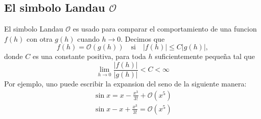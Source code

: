 \documentclass{article}
\begin{document}
\subsection{El simbolo Landau $\mathcal O$}
El simbolo Landau $\mathcal O$ es usado para comparar el
comportamiento de una funcion $f(h)$ con otra $g(h)$ cuando $h\to
0$. Decimos que 
\begin{equation}
f(h)=\mathcal{O}(g(h))\quad \text{si}\quad |f(h)|\leq C|g(h)|,
\end{equation}
donde $C$ es una constante positiva, para toda $h$ suficientemente
pequeña tal que
\[
\lim_{h\to 0}\frac{|f(h)|}{|g(h)|}<C<\infty
\]
Por ejemplo, uno puede escribir la expansion del seno de la siguiente
manera:
\[
\begin{split}
\sin x=x-\frac{x^3}{3!}+ \mathcal{O}(x^5)\\
\sin x-x+\frac{x^3}{3!}=\mathcal{O}(x^5)
\end{split}
\]
\end{document}
